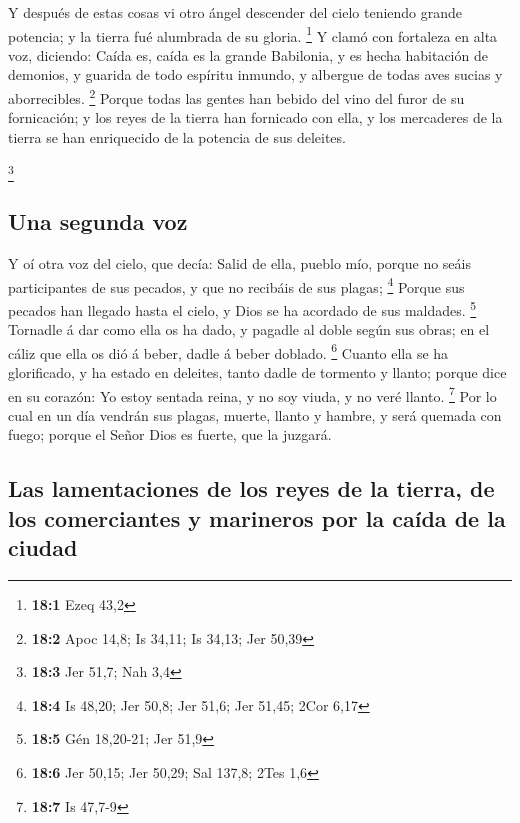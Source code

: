  Y después de estas cosas vi otro ángel descender del
cielo teniendo grande potencia; y la tierra fué alumbrada de su gloria.
\footnote{\textbf{18:1} Ezeq 43,2}  Y clamó con fortaleza
en alta voz, diciendo: Caída es, caída es la grande Babilonia, y es
hecha habitación de demonios, y guarida de todo espíritu inmundo, y
albergue de todas aves sucias y aborrecibles. \footnote{\textbf{18:2}
  Apoc 14,8; Is 34,11; Is 34,13; Jer 50,39}  Porque todas
las gentes han bebido del vino del furor de su fornicación; y los reyes
de la tierra han fornicado con ella, y los mercaderes de la tierra se
han enriquecido de la potencia de sus deleites.

\footnote{\textbf{18:3} Jer 51,7; Nah 3,4}

\hypertarget{una-segunda-voz}{%
\subsection{Una segunda voz}\label{una-segunda-voz}}

 Y oí otra voz del cielo, que decía: Salid de ella, pueblo
mío, porque no seáis participantes de sus pecados, y que no recibáis de
sus plagas; \footnote{\textbf{18:4} Is 48,20; Jer 50,8; Jer 51,6; Jer
  51,45; 2Cor 6,17}  Porque sus pecados han llegado hasta
el cielo, y Dios se ha acordado de sus maldades. \footnote{\textbf{18:5}
  Gén 18,20-21; Jer 51,9}  Tornadle á dar como ella os ha
dado, y pagadle al doble según sus obras; en el cáliz que ella os dió á
beber, dadle á beber doblado. \footnote{\textbf{18:6} Jer 50,15; Jer
  50,29; Sal 137,8; 2Tes 1,6}  Cuanto ella se ha
glorificado, y ha estado en deleites, tanto dadle de tormento y llanto;
porque dice en su corazón: Yo estoy sentada reina, y no soy viuda, y no
veré llanto. \footnote{\textbf{18:7} Is 47,7-9}  Por lo
cual en un día vendrán sus plagas, muerte, llanto y hambre, y será
quemada con fuego; porque el Señor Dios es fuerte, que la juzgará.

\hypertarget{las-lamentaciones-de-los-reyes-de-la-tierra-de-los-comerciantes-y-marineros-por-la-cauxedda-de-la-ciudad}{%
\subsection{Las lamentaciones de los reyes de la tierra, de los
comerciantes y marineros por la caída de la
ciudad}\label{las-lamentaciones-de-los-reyes-de-la-tierra-de-los-comerciantes-y-marineros-por-la-cauxedda-de-la-ciudad}}

